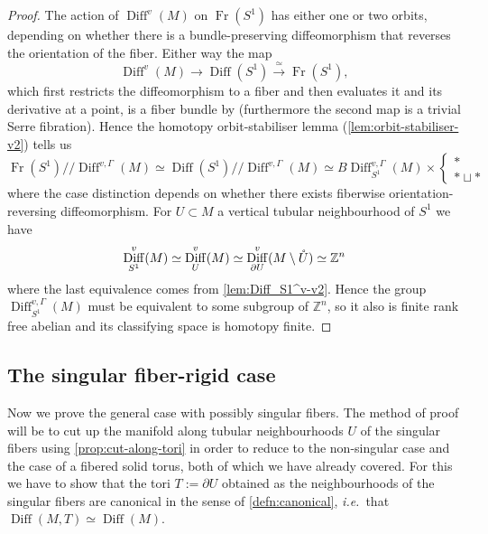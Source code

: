 \documentclass{amsart}
\theoremstyle{plain}
\theoremstyle{definition}
\DeclareMathOperator\Diff{Diff}
\DeclareMathOperator\Fr{Fr}
\newcommand{\interior}[1]{\smash{\mathring{#1}}}
\newcommand{\hq}{/\!\!/} %
\newcommand{\BDiff}{B\!\Diff}
\newcommand{\bbZ}{\mathbb{Z}}
\begin{document}
\begin{proof}
    The action of $\Diff^v(M)$ on $\Fr(S^1)$ has either one or two orbits, depending on whether there is a bundle-preserving diffeomorphism that reverses the orientation of the fiber.
    Either way the map
    \[
        \Diff^v(M) \longrightarrow \Diff(S^1) \xrightarrow{\ \simeq\ } \Fr(S^1),
    \]
    which first restricts the diffeomorphism to a fiber and then evaluates it and its derivative at a point, is a fiber bundle by \cite[Corollary 3.8.(ii)]{HKMR12} (furthermore the second map is a trivial Serre fibration). Hence the homotopy orbit-stabiliser lemma (\cref{lem:orbit-stabiliser-v2}) tells us
    \[
        \Fr(S^1)\hq \Diff^{v, \Gamma}(M) \simeq \Diff(S^1)\hq \Diff^{v, \Gamma}(M) \simeq \BDiff_{S^1}^{v, \Gamma}(M) \times \begin{cases}
            * \\
            * \sqcup * 
        \end{cases}
    \]
    where the case distinction depends on whether there exists fiberwise orientation-reversing diffeomorphism.
    For $U\subset M$ a vertical tubular neighbourhood of $S^1$ we have 
    \[
        \Diff_{S^1}^v(M) \simeq \Diff_U^v(M) \simeq \Diff_{\partial U}^v(M\setminus \interior{U}) \simeq \bbZ^n
    \]
    where the last equivalence comes from \cref{lem:Diff_S1^v-v2}.
    Hence the group $\Diff_{S^1}^{v,\Gamma}(M)$ must be equivalent to some subgroup of $\bbZ^n$, so it also is finite rank free abelian and its classifying space is homotopy finite.
\end{proof}

\subsection{The singular fiber-rigid case}\label{subsec:singSF}
Now we prove the general case with possibly singular fibers. 
The method of proof will be to cut up the manifold along tubular neighbourhoods $U$ of the singular fibers using \cref{prop:cut-along-tori} in order to reduce to the non-singular case and the case of a fibered solid torus, both of which we have already covered.
For this we have to show that the tori $T := \partial U$ obtained as the neighbourhoods of the singular fibers are canonical in the sense of \cref{defn:canonical}, \emph{i.e.}~that $\Diff(M, T) \simeq \Diff(M)$.
\end{document}
